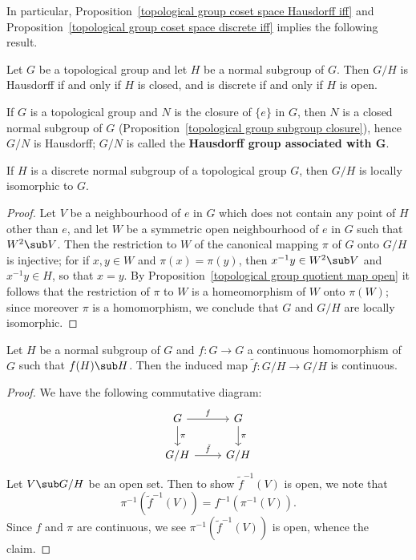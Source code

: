 In particular, Proposition~\ref{topological group coset space Hausdorff iff} and Proposition~\ref{topological group coset space discrete iff} implies the following result.
\begin{proposition}\label{topological group quotient group Hausdorff or discrete iff}
Let $G$ be a topological group and let $H$ be a normal subgroup of $G$. Then $G/H$ is Hausdorff if and only if $H$ is closed, and is discrete if and only if $H$ is open.
\end{proposition}
If $G$ is a topological group and $N$ is the closure of $\{e\}$ in $G$, then $N$ is a closed normal subgroup of $G$ (Proposition~\ref{topological group subgroup closure}), hence $G/N$ is Hausdorff; $G/N$ is called the \textbf{Hausdorff group associated with $\bm{G}$}.
\begin{proposition}\label{topological group quotient by discrete normal}
If $H$ is a discrete normal subgroup of a topological group $G$, then $G/H$ is locally isomorphic to $G$.
\end{proposition}
\begin{proof}
Let $V$ be a neighbourhood of $e$ in $G$ which does not contain any point of $H$ other than $e$, and let $W$ be a symmetric open neighbourhood of $e$ in $G$ such that $W^2\sub V$. Then the restriction to $W$ of the canonical mapping $\pi$ of $G$ onto $G/H$ is injective; for if $x,y\in W$ and $\pi(x)=\pi(y)$, then $x^{-1}y\in W^2\sub V$ and $x^{-1}y\in H$, so that $x=y$. By Proposition~\ref{topological group quotient map open} it follows that the restriction of $\pi$ to $W$ is a homeomorphism of $W$ onto $\pi(W)$; since moreover $\pi$ is a homomorphism, we conclude that $G$ and $G/H$ are locally isomorphic.
\end{proof}
\begin{proposition}\label{topological group induced map on quotient continuous}
Let $H$ be a normal subgroup of $G$ and $f:G\to G$ a continuous homomorphism of $G$ such that $f(H)\sub H$. Then the induced map $\tilde{f}:G/H\to G/H$ is continuous.
\end{proposition}
\begin{proof}
We have the following commutative diagram:
\[\begin{tikzcd}
G\ar[d,"\pi"]\ar[r,"f"]&G\ar[d,"\pi"]\\
G/H\ar[r,"\tilde{f}"]&G/H
\end{tikzcd}\]
Let $V\sub G/H$ be an open set. Then to show $\tilde{f}^{-1}(V)$ is open, we note that
\[\pi^{-1}(\tilde{f}^{-1}(V))=f^{-1}(\pi^{-1}(V)).\]
Since $f$ and $\pi$ are continuous, we see $\pi^{-1}(\tilde{f}^{-1}(V))$ is open, whence the claim.
\end{proof}
